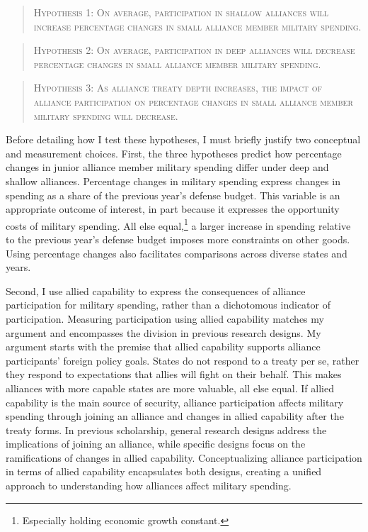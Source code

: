 \documentclass[12pt]{article}
\begin{document}
\begin{quote}
\textsc{Hypothesis 1: On average, participation in shallow alliances will increase percentage changes in small alliance member military spending.}
\end{quote}

\begin{quote}
\textsc{Hypothesis 2: On average, participation in deep alliances will decrease percentage changes in small alliance member military spending.}
\end{quote}

\begin{quote}
\textsc{Hypothesis 3: As alliance treaty depth increases, the impact of alliance participation on percentage changes in small alliance member military spending will decrease.}
\end{quote}


Before detailing how I test these hypotheses, I must briefly justify two conceptual and measurement choices. 
First, the three hypotheses predict how percentage changes in junior alliance member military spending differ under deep and shallow alliances. 
Percentage changes in military spending express changes in spending as a share of the previous year's defense budget.
This variable is an appropriate outcome of interest, in part because it expresses the opportunity costs of military spending. 
All else equal,\footnote{Especially holding economic growth constant.} a larger increase in spending relative to the previous year's defense budget imposes more constraints on other goods. 
Using percentage changes also facilitates comparisons across diverse states and years. 


Second, I use allied capability to express the consequences of alliance participation for military spending, rather than a dichotomous indicator of participation.
Measuring participation using allied capability matches my argument and encompasses the division in  previous research designs. 
My argument starts with the premise that allied capability supports alliance participants' foreign policy goals. 
States do not respond to a treaty per se, rather they respond to expectations that allies will fight on their behalf.
This makes alliances with more capable states are more valuable, all else equal.
If allied capability is the main source of security, alliance participation affects military spending through joining an alliance and changes in allied capability after the treaty forms. 
In previous scholarship, general research designs address the implications of joining an alliance, while specific designs focus on the ramifications of changes in allied capability. 
Conceptualizing alliance participation in terms of allied capability encapsulates both designs, creating a unified approach to understanding how alliances affect military spending. 
\end{document}
